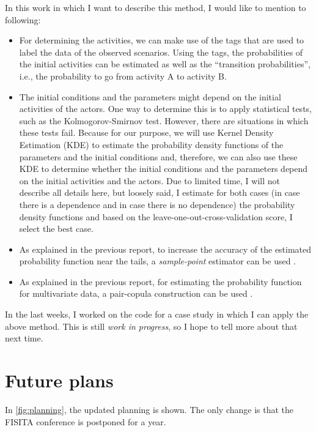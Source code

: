 \documentclass[10pt,final,a4paper,oneside,onecolumn]{article}
\begin{document}
In this work in which I want to describe this method, I would like to mention to following:
\begin{itemize}
	\item For determining the activities, we can make use of the tags that are used to label the data of the observed scenarios. Using the tags, the probabilities of the initial activities can be estimated as well as the ``transition probabilities'', i.e., the probability to go from activity A to activity B.
	\item The initial conditions and the parameters might depend on the initial activities of the actors. One way to determine this is to apply statistical tests, such as the Kolmogorov-Smirnov test. However, there are situations in which these tests fail. Because for our purpose, we will use Kernel Density Estimation (KDE) to estimate the probability density functions of the parameters and the initial conditions and, therefore, we can also use these KDE to determine whether the initial conditions and the parameters depend on the initial activities and the actors. Due to limited time, I will not describe all details here, but loosely said, I estimate for both cases (in case there is a dependence and in case there is no dependence) the probability density functions and based on the leave-one-out-cross-validation score, I select the best case.
	\item As explained in the previous report, to increase the accuracy of the estimated probability function near the tails, a \emph{sample-point} estimator can be used \autocite{sain2002multivariate}.
	\item As explained in the previous report, for estimating the probability function for multivariate data, a pair-copula construction can be used \autocite{aas2009paircopula,czado2010paircopula,nagler2016evading}.
\end{itemize}

In the last weeks, I worked on the code for a case study in which I can apply the above method. This is still \emph{work in progress}, so I hope to tell more about that next time.

\section{Future plans}

In \cref{fig:planning}, the updated planning is shown. The only change is that the FISITA conference is postponed for a year. 
\end{document}
